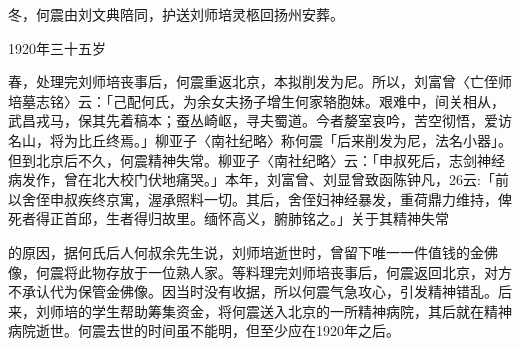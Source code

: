 冬，何震由刘文典陪同，护送刘师培灵柩回扬州安葬。

1920年三十五岁

春，处理完刘师培丧事后，何震重返北京，本拟削发为尼。所以，刘富曾〈亡侄师培墓志铭〉云：「己配何氏，为余女夫扬子增生何家辂胞妹。艰难中，间关相从，武昌戎马，保其先着稿本；蚕丛崎岖，寻夫蜀道。今者嫠室哀吟，苦空彻悟，爱访名山，将为比丘终焉。」柳亚子〈南社纪略〉称何震「后来削发为尼，法名小器」。但到北京后不久，何震精神失常。柳亚子〈南社纪略〉云：「申叔死后，志剑神经病发作，曾在北大校门伏地痛哭。」本年，刘富曾、刘显曾致函陈钟凡，26云:「前以舍侄申叔疾终京寓，渥承照料一切。其后，舍侄妇神经暴发，重荷鼎力维持，俾死者得正首邱，生者得归故里。缅怀高义，腑肺铭之。」关于其精神失常

\vfill
\begin{BookNotes}
\end{BookNotes}

\noindent 的原因，据何氏后人何叔余先生说，刘师培逝世时，曾留下唯一一件值钱的金佛像，何震将此物存放于一位熟人家。等料理完刘师培丧事后，何震返回北京，对方不承认代为保管金佛像。因当时没有收据，所以何震气急攻心，引发精神错乱。后来，刘师培的学生帮助筹集资金，将何震送入北京的一所精神病院，其后就在精神病院逝世。何震去世的时间虽不能明，但至少应在1920年之后。


